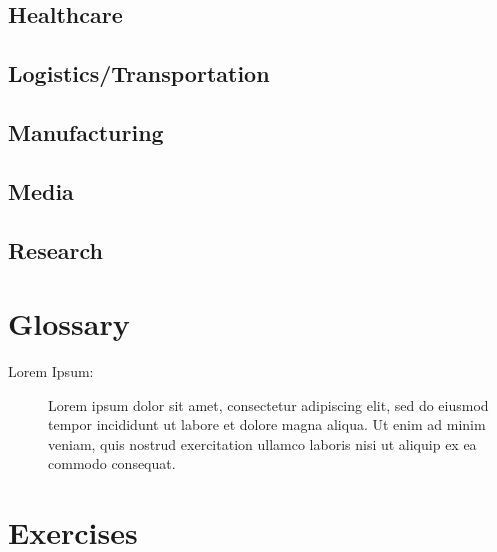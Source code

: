 \subsection{Healthcare}

\subsection{Logistics/Transportation}

\subsection{Manufacturing}

\subsection{Media}

\subsection{Research}




\section{Glossary}

\begin{description}
	
	\item[Lorem Ipsum:]  Lorem ipsum dolor sit amet, consectetur adipiscing elit, sed do eiusmod tempor incididunt ut labore et dolore magna aliqua. Ut enim ad minim veniam, quis nostrud exercitation ullamco laboris nisi ut aliquip ex ea commodo consequat.
	
\end{description}

\section{Exercises}

